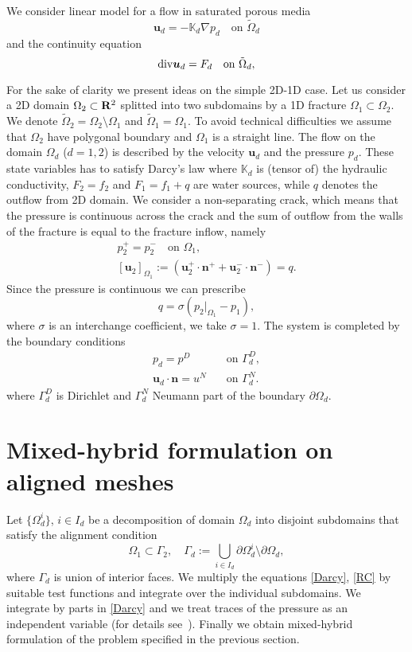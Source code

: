 \documentclass{elsart}
\def\div{{\rm div}}
\def\grad{\nabla}
\def\Real{{\rm\bf R}}
\def\vc#1{\mathbf{\boldsymbol{#1}}}     %
\def\tn#1{{\mathbb{#1}}}    %
\def\prtl{\partial}                                        %
\def\vl{{\vc{u}}}
\begin{document}
We consider linear model for a flow in saturated porous media
\begin{equation}\label{Darcy}
        \vl_d=-\tn K_d \grad p_d \quad \text{on }\tilde \Omega_d
\end{equation}
and the continuity equation
\begin{equation}\label{RC}
        \div \vl_d = F_d        \quad \text{on }\tilde \Omega_d,
\end{equation}


For the sake of clarity we present ideas on the simple 2D-1D case. Let us consider a 2D domain $\Omega_2\subset \Real^2$
splitted into two subdomains by a 1D fracture $\Omega_1\subset\Omega_2$.
We denote $ \tilde\Omega_2=\Omega_2\setminus\Omega_1$ and $\tilde\Omega_1=\Omega_1$.
To avoid technical difficulties we assume that $\Omega_2$ have polygonal boundary and $\Omega_1$ is a straight line. The flow on the domain $\Omega_d$ ($d=1,2$) is described by the velocity $\vl_d$ and the pressure
$p_d$. These state variables has to satisfy Darcy's law
where $\tn K_d$ is (tensor of) the hydraulic conductivity, $F_2=f_2$ and $F_1=f_1+q$
are water sources, while $q$ denotes the outflow from 2D domain. We consider a non-separating crack, which means that the pressure is continuous across the crack and the sum of outflow from the walls of the fracture is equal to the fracture inflow,
namely  
\begin{gather*}
 	p_2^{+} = p_2^{-}\quad \text{on }\Omega_1,\\
 	[\vl_2]_{\Omega_1}:= (\vc \vl_2^{+}\cdot\vc n^{+} + \vc u_2^{-}\cdot\vc n^{-}) = q.
\end{gather*}
Since the pressure is continuous we can prescribe
\[
 q=\sigma(p_2|_{\Omega_1} - p_1),
\]
where $\sigma$ is an interchange coefficient, we take $\sigma=1$. The system is completed by the boundary conditions
\begin{align*}
        p_d = p^D&\quad \text{on }\Gamma_d^D,\\
        \vl_d\cdot\vc n= u^N&\quad \text{on }\Gamma_d^N.
\end{align*}
where $\Gamma_d^D$ is Dirichlet and $\Gamma_d^N$ Neumann part of the boundary $\prtl\Omega_d$.

\section{Mixed-hybrid formulation on aligned meshes}
Let $\{\Omega_d^i\}$, $i\in I_d$ be a decomposition of domain $\Omega_d$ into disjoint subdomains
that satisfy the alignment condition
\begin{equation}\label{compatible}
 	\Omega_1\subset \Gamma_2,\quad \Gamma_d:=\bigcup_{i\in I_d} \prtl\Omega_d^i\setminus\prtl\Omega_d,
\end{equation}
where $\Gamma_d$ is union of interior faces. We multiply the equations \eqref{Darcy},
\eqref{RC} by suitable test functions and integrate over the individual subdomains.
We integrate by parts in \eqref{Darcy} and we treat traces of the pressure as
an independent variable (for details see~\cite{Maryska}). Finally we obtain mixed-hybrid formulation of the problem specified in the previous section.
\end{document}
